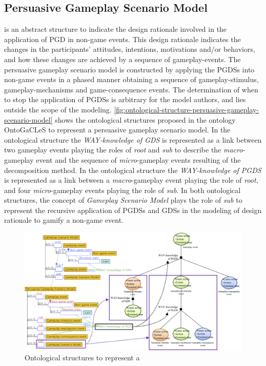 \subsection{Persuasive Gameplay Scenario Model}
\label{subsec:persuasive-gameplay-scenario-model}

 is an abstract structure to indicate the design rationale involved in the application of PGD in non-game events. This design rationale indicates the changes in the participants' attitudes, intentions, motivations and/or behaviors, and how these changes are achieved by a sequence of gameplay-events. The persuasive gameplay scenario model is constructed by applying the PGDSs into non-game events in a phased manner obtaining a sequence of gameplay-stimulus, gameplay-mechanisms and game-consequence events. The determination of when to stop the application of PGDSs is arbitrary for the model authors, and lies outside the scope of the modeling. \autoref{fig:ontological-structure-persuasive-gameplay-scenario-model} shows the ontological structures proposed in the ontology OntoGaCLeS to represent a persuasive gameplay scenario model. In the ontological structure  the \emph{WAY-knowledge of GDS} is represented as a link between two gameplay events playing the roles of \emph{root} and \emph{sub} to describe the \emph{macro}-gameplay event and the sequence of \emph{micro}-gameplay events resulting of the decomposition method. In the ontological structure  the \emph{WAY-knowledge of PGDS} is represented as a link between a \emph{macro}-gameplay event playing the role of \emph{root}, and four \emph{micro}-gameplay events playing the role of \emph{sub}. In both ontological structures, the concept of \emph{Gameplay Scenario Model} plays the role of \emph{sub} to represent the recursive application of PGDSs and GDSs in the modeling of design rationale to gamify a non-game event.

\begin{figure}[!htb]
 \caption[Ontological structures to represent a persuasive gameplay scenario model]{Ontological structures to represent a }
 \label{fig:ontological-structure-persuasive-gameplay-scenario-model}
 \centering
 \includegraphics[width=1\textwidth]{images/chap-ontogacles2/ontological-structure-persuasive-gameplay-scenario-model.png}
 \fautor
\end{figure}


